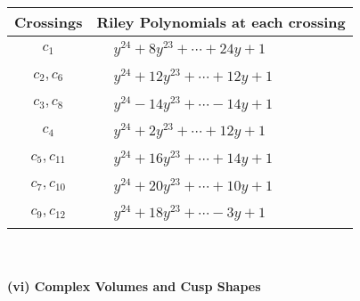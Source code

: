 \documentclass[1p]{elsarticle_modified}
\theoremstyle{definition}
\begin{document}
\begin{tabular}{m{50pt}|m{274pt}}
Crossings & \hspace{64pt}Riley Polynomials at each crossing \\
\hline $$\begin{aligned}c_{1}\end{aligned}$$&$\begin{aligned}
&y^{24}+8 y^{23}+\cdots+24 y+1
\end{aligned}$\\
\hline $$\begin{aligned}c_{2},c_{6}\end{aligned}$$&$\begin{aligned}
&y^{24}+12 y^{23}+\cdots+12 y+1
\end{aligned}$\\
\hline $$\begin{aligned}c_{3},c_{8}\end{aligned}$$&$\begin{aligned}
&y^{24}-14 y^{23}+\cdots-14 y+1
\end{aligned}$\\
\hline $$\begin{aligned}c_{4}\end{aligned}$$&$\begin{aligned}
&y^{24}+2 y^{23}+\cdots+12 y+1
\end{aligned}$\\
\hline $$\begin{aligned}c_{5},c_{11}\end{aligned}$$&$\begin{aligned}
&y^{24}+16 y^{23}+\cdots+14 y+1
\end{aligned}$\\
\hline $$\begin{aligned}c_{7},c_{10}\end{aligned}$$&$\begin{aligned}
&y^{24}+20 y^{23}+\cdots+10 y+1
\end{aligned}$\\
\hline $$\begin{aligned}c_{9},c_{12}\end{aligned}$$&$\begin{aligned}
&y^{24}+18 y^{23}+\cdots-3 y+1
\end{aligned}$\\
\hline
\end{tabular}\\~\\
\newpage\flushleft \textbf{(vi) Complex Volumes and Cusp Shapes}
\end{document}
